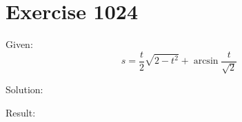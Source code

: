 \documentclass[a4paper, 10pt]{scrartcl}
\begin{document}
\section{Exercise 1024}

Given:
\[
s = \frac{t}{2}\sqrt{2 - t^{2}} + \arcsin{\frac{t}{\sqrt{2}}}
\]

Solution:

Result:
\end{document}
